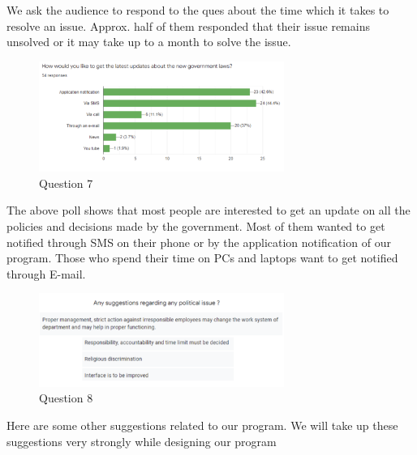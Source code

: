 \documentclass[acmtog]{acmart}
\begin{document}
We ask the audience to respond to the ques about the time which it takes to resolve an issue. Approx. half of them responded that their issue remains unsolved or it may take up to a month to solve the issue.

\begin{figure}[H]
    \includegraphics[width=8cm]{Resources/q7}
    \caption{Question 7}
    \label{fig:q7}
\end{figure}

The above poll shows that most people are interested to get an update on all the policies and decisions made by the government. Most of them wanted to get notified through SMS on their phone or by the application notification of our program. Those who spend their time on PCs and laptops want to get notified through E-mail.

\begin{figure}[H]
    \includegraphics[width=8cm]{Resources/q8}
    \caption{Question 8}
    \label{fig:q8}
\end{figure}

Here are some other suggestions related to our program. We will take up these suggestions very strongly while designing our program
\end{document}
